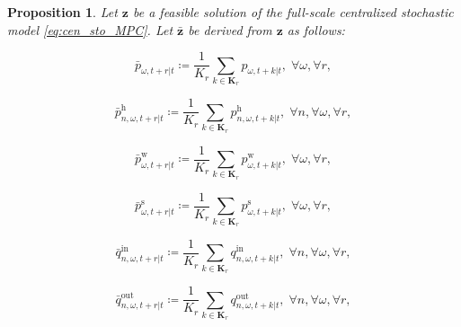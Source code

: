 \documentclass[a4paper,fleqn]{cas-sc}
\newtheorem{proposition}{Proposition}
\begin{document}
\begin{proposition}\label{prop:main_result}
Let $\boldsymbol{z}$ be a feasible solution of the full-scale centralized stochastic model \eqref{eq:cen_sto_MPC}.
Let $\boldsymbol{\bar{z}}$ be derived from $\boldsymbol{z}$ as follows:

\noindent
\begin{minipage}{0.5\textwidth}
\begin{equation}\label{prop_agg_vars1}
\bar{p}_{\omega,t+r|t} \coloneqq
\frac{1}{K_r} \sum_{k \in \boldsymbol{K}_r} p_{\omega,t+k|t},
\; \forall \omega, \forall r,
\end{equation}
\end{minipage}%
\hfill
\begin{minipage}{0.5\textwidth}
\begin{equation}\label{prop_agg_vars2}
\bar{p}^{\mathrm{h}}_{n,\omega,t+r|t} \coloneqq
\frac{1}{K_r} \sum_{k \in \boldsymbol{K}_r}
p^{\mathrm{h}}_{n,\omega,t+k|t},
\; \forall n, \forall \omega, \forall r,
\end{equation}
\end{minipage}

\noindent
\begin{minipage}{0.5\textwidth}
\begin{equation}\label{prop_agg_vars3}
\bar{p}^{\mathrm{w}}_{\omega,t+r|t} \coloneqq
\frac{1}{K_r} \sum_{k \in \boldsymbol{K}_r}
p^{\mathrm{w}}_{\omega,t+k|t},
\; \forall \omega, \forall r,
\end{equation}
\end{minipage}%
\hfill
\begin{minipage}{0.5\textwidth}
\begin{equation}\label{prop_agg_vars4}
\bar{p}^{\mathrm{s}}_{\omega,t+r|t} \coloneqq
\frac{1}{K_r} \sum_{k \in \boldsymbol{K}_r}
p^{\mathrm{s}}_{\omega,t+k|t},
\; \forall \omega, \forall r,
\end{equation}
\end{minipage}

\noindent
\begin{minipage}{0.5\textwidth}
\begin{equation}\label{prop_agg_vars5}
\bar{q}^{\mathrm{in}}_{n,\omega,t+r|t} \coloneqq
\frac{1}{K_r} \sum_{k \in \boldsymbol{K}_r}
q^{\mathrm{in}}_{n,\omega,t+k|t},
\; \forall n, \forall \omega, \forall r,
\end{equation}
\end{minipage}%
\hfill
\begin{minipage}{0.5\textwidth}
\begin{equation}\label{prop_agg_vars6}
\bar{q}^{\mathrm{out}}_{n,\omega,t+r|t} \coloneqq
\frac{1}{K_r} \sum_{k \in \boldsymbol{K}_r}
q^{\mathrm{out}}_{n,\omega,t+k|t},
\; \forall n, \forall \omega, \forall r,
\end{equation}
\end{minipage}


\end{proposition}
\end{document}
